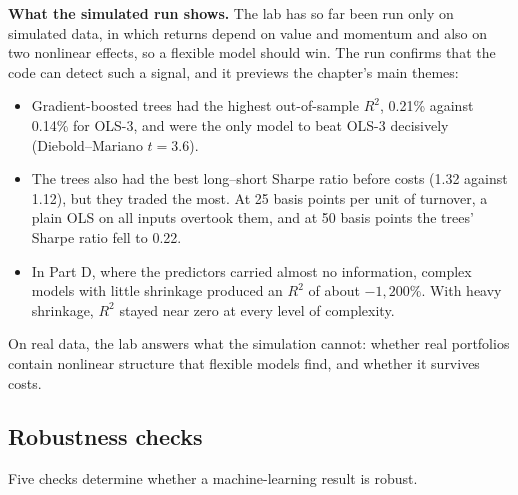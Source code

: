 \textbf{What the simulated run shows.} The lab has so far been run only on simulated data, in which returns depend on value and momentum and also on two nonlinear effects, so a flexible model should win. The run confirms that the code can detect such a signal, and it previews the chapter's main themes:
\begin{itemize}
  \item Gradient-boosted trees had the highest out-of-sample $R^2$, 0.21\% against 0.14\% for OLS-3, and were the only model to beat OLS-3 decisively (Diebold--Mariano $t = 3.6$).
  \item The trees also had the best long--short Sharpe ratio before costs (1.32 against 1.12), but they traded the most. At 25 basis points per unit of turnover, a plain OLS on all inputs overtook them, and at 50 basis points the trees' Sharpe ratio fell to 0.22.
  \item In Part D, where the predictors carried almost no information, complex models with little shrinkage produced an $R^2$ of about $-1{,}200\%$. With heavy shrinkage, $R^2$ stayed near zero at every level of complexity.
\end{itemize}
On real data, the lab answers what the simulation cannot: whether real portfolios contain nonlinear structure that flexible models find, and whether it survives costs.

\subsection{Robustness checks}
\label{sec:20-stress}

Five checks determine whether a machine-learning result is robust.

